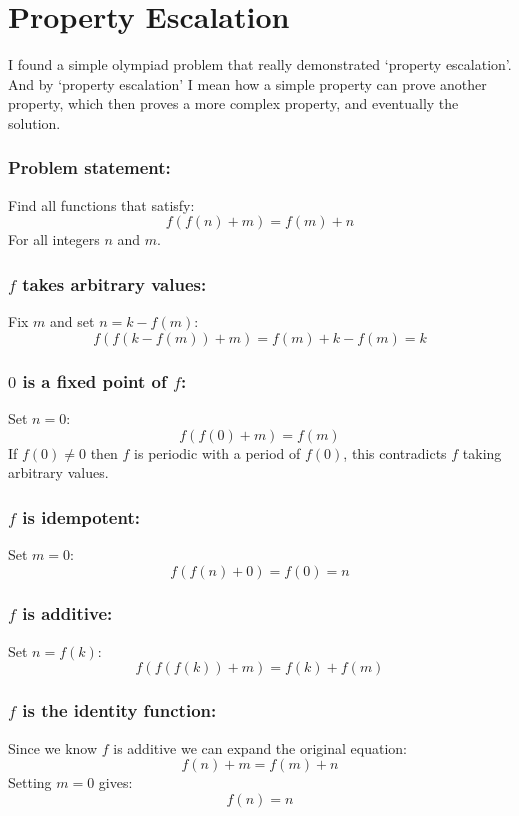 
\section{Property Escalation}
I found a simple olympiad problem that really demonstrated `property escalation'.
And by `property escalation' I mean how a simple property can prove another property,
which then proves a more complex property,
and eventually the solution.

\subsubsection{Problem statement:}
Find all functions that satisfy:
\[f(f(n)+m) = f(m)+n\]
For all integers $n$ and $m$.

\subsubsection{$f$ takes arbitrary values:}
Fix $m$ and set $n=k-f(m)$:
\[f(f(k-f(m))+m) = f(m)+k-f(m) = k\]

\subsubsection{$0$ is a fixed point of $f$:}
Set $n=0$:
\[f(f(0)+m)=f(m)\]
If $f(0)\neq0$ then $f$ is periodic with a period of $f(0)$,
this contradicts $f$ taking arbitrary values.

\subsubsection{$f$ is idempotent:}
Set $m=0$:
\[f(f(n)+0) = f(0) = n\]

\subsubsection{$f$ is additive:}
Set $n=f(k)$:
\[f(f(f(k))+m) = f(k)+f(m)\]

\subsubsection{$f$ is the identity function:}
Since we know $f$ is additive we can expand the original equation:
\[f(n)+m=f(m)+n\]
Setting $m=0$ gives:
\[f(n)=n\]
